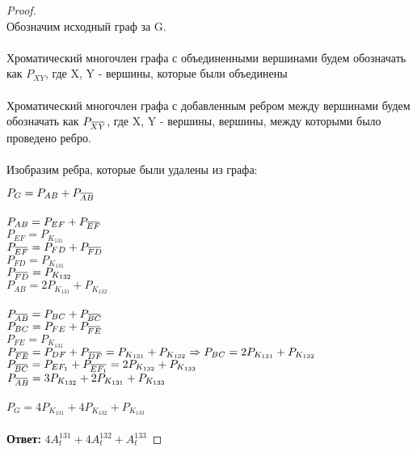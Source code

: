 \newcommand{\ols}[1]{\mskip.5\thinmuskip\overline{\mskip-.5\thinmuskip {#1} \mskip-.5\thinmuskip}\mskip.5\thinmuskip} %

\begin{proof} $ $\\
    Обозначим исходный граф за G.\\\\
    Хроматический многочлен графа с объединенными вершинами будем обозначать как $P_{XY}$, где X, Y - вершины, которые были объединены\\\\
    Хроматический многочлен графа с добавленным ребром между вершинами будем обозначать как $P_{\ols{XY}}$, где X, Y - вершины, вершины, между которыми было проведено ребро.\\\\
    Изобразим ребра, которые были удалены из графа:
    \begin{center}
    \end{center}
    $P_G = P_{AB} + P_{\ols{AB}}$\\\\
    $P_{AB} = P_{EF} + P_{\ols{EF}}$\\
    $P_{EF} = P_{K_{131}}$\\
    $P_{\ols{EF}} = P_{FD} + P_{\ols{FD}}$\\
    $P_{FD} = P_{K_{131}}$\\
    $P_{\ols{FD}} = P_{K_{132}}$\\
    $P_{AB} = 2P_{K_{131}} + P_{K_{132}}$\\\\
    $P_{\ols{AB}} = P_{BC} + P_{\ols{BC}}$\\
    $P_{BC} = P_{FE} + P_{\ols{FE}}$\\
    $P_{FE} = P_{K_{131}}$\\
    $P_{\ols{FE}} = P_{DF} + P_{\ols{DF}} = P_{K_{131}} + P_{K_{132}} \Rightarrow P_{BC} = 2P_{K_{131}} + P_{K_{132}}$\\
    $P_{\ols{BC}} = P_{EF_1} + P_{\ols{EF_1}} = 2P_{K_{132}} + P_{K_{133}}$\\
    $P_{\ols{AB}} = 3P_{K_{132}} + 2P_{K_{131}} + P_{K_{133}}$\\\\
    $P_G = 4P_{K_{131}} + 4P_{K_{132}} + P_{K_{133}}$\\\\
    
    \textbf{Ответ:} $4A_t^{131} + 4A_t^{132} + A_t^{133}$
\end{proof}